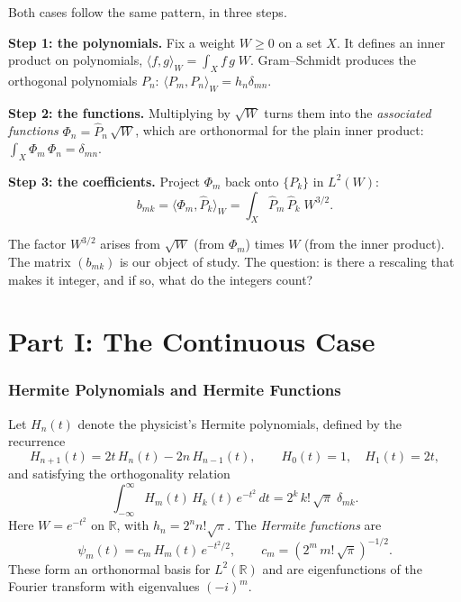 \documentclass[11pt,a4paper]{article}
\theoremstyle{plain}
\theoremstyle{definition}
\newcommand{\R}{\mathbb{R}}
\begin{document}
\begin{tcolorbox}[breakable, colback=black!5, colframe=black!5,
  boxrule=0pt, sharp corners]
Both cases follow the same pattern, in three steps.

\textbf{Step 1: the polynomials.} Fix a weight $W \ge 0$ on a set
$X$. It defines an inner product on polynomials,
$\langle f, g \rangle_W = \int_X f\, g\; W$.
Gram--Schmidt produces the orthogonal polynomials $P_n$:
$\langle P_m, P_n \rangle_W = h_n \delta_{mn}$.

\textbf{Step 2: the functions.} Multiplying by $\sqrt{W}$ turns
them into the \emph{associated functions}
$\Phi_n = \widehat P_n\, \sqrt{W}$,
which are orthonormal for the plain inner product:
$\int_X \Phi_m\, \Phi_n = \delta_{mn}$.

\textbf{Step 3: the coefficients.} Project $\Phi_m$ back onto
$\{P_k\}$ in $L^2(W)$:
\[
  b_{mk} = \langle \Phi_m, \widehat P_k \rangle_W
  = \int_X \widehat P_m\, \widehat P_k\; W^{3/2}.
\]

The factor $W^{3/2}$ arises from $\sqrt{W}$ (from $\Phi_m$)
times $W$ (from the inner product). The matrix $(b_{mk})$
is our object of study. The question: is there a rescaling
that makes it integer, and if so, what do the integers count?
\end{tcolorbox}


\part*{Part I: The Continuous Case}

\section{Hermite Polynomials and Hermite Functions}

Let $H_n(t)$ denote the physicist's Hermite polynomials, defined by
the recurrence
\[
  H_{n+1}(t) = 2t\, H_n(t) - 2n\, H_{n-1}(t),
  \qquad H_0(t) = 1,\quad H_1(t) = 2t,
\]
and satisfying the orthogonality relation
\begin{equation}\label{eq:hermite-orth}
  \int_{-\infty}^{\infty} H_m(t)\, H_k(t)\, e^{-t^2}\, dt
  = 2^k\, k!\, \sqrt{\pi}\; \delta_{mk}.
\end{equation}
Here $W = e^{-t^2}$ on $\R$, with $h_n = 2^n n! \sqrt{\pi}$.
The \emph{Hermite functions} are
\begin{equation}\label{eq:hermite-fn}
  \psi_m(t) = c_m\, H_m(t)\, e^{-t^2/2},
  \qquad c_m = (2^m\, m!\, \sqrt{\pi})^{-1/2}.
\end{equation}
These form an orthonormal basis for $L^2(\R)$ and are eigenfunctions
of the Fourier transform with eigenvalues $(-i)^m$.
\end{document}
